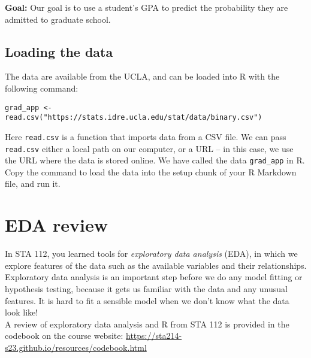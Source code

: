 \documentclass[11pt]{article}
\begin{document}
\noindent \textbf{Goal:} Our goal is to use a student's GPA to predict the probability they are admitted to graduate school.

\subsection*{Loading the data}

The data are available from the UCLA, and can be loaded into R with the following command:

\begin{verbatim}
grad_app <- read.csv("https://stats.idre.ucla.edu/stat/data/binary.csv")
\end{verbatim}

\noindent Here \texttt{read.csv} is a function that imports data from a CSV file. We can pass \texttt{read.csv} either a local path on our computer, or a URL -- in this case, we use the URL where the data is stored online. We have called the data \verb;grad_app; in R.\\

\noindent Copy the command to load the data into the setup chunk of your R Markdown file, and run it.

\newpage

\section{EDA review}

In STA 112, you learned tools for \textit{exploratory data analysis} (EDA), in which we explore features of the data such as the available variables and their relationships. Exploratory data analysis is an important step before we do any model fitting or hypothesis testing, because it gets us familiar with the data and any unusual features. It is hard to fit a sensible model when we don't know what the data look like!\\

\noindent A review of exploratory data analysis and R from STA 112 is provided in the codebook on the course website: \url{https://sta214-s23.github.io/resources/codebook.html} 
\end{document}
